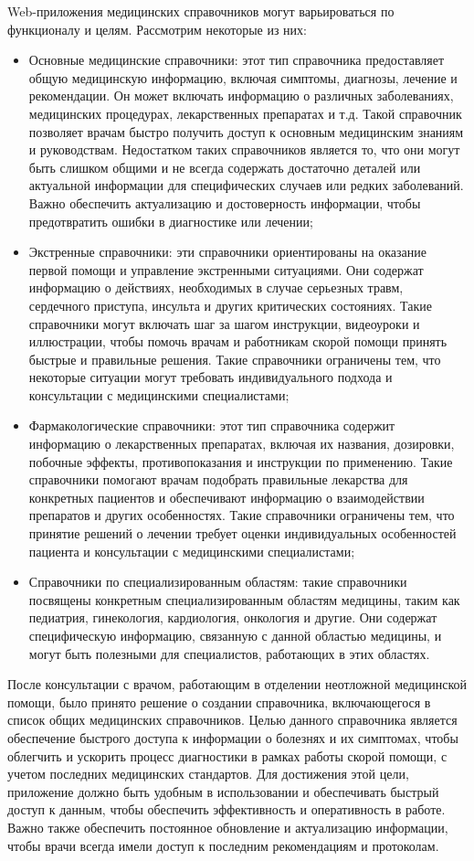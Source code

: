 Web-приложения медицинских справочников могут варьироваться по функционалу и целям. Рассмотрим некоторые из них:
\begin{itemize}
    \item Основные медицинские справочники: этот тип справочника предоставляет общую медицинскую информацию, включая симптомы, диагнозы, лечение и рекомендации. Он может включать информацию о различных заболеваниях, медицинских процедурах, лекарственных препаратах и т.д. Такой справочник позволяет врачам быстро получить доступ к основным медицинским знаниям и руководствам. Недостатком таких справочников является то, что они могут быть слишком общими и не всегда содержать достаточно деталей или актуальной информации для специфических случаев или редких заболеваний. Важно обеспечить актуализацию и достоверность информации, чтобы предотвратить ошибки в диагностике или лечении;
    \item Экстренные справочники: эти справочники ориентированы на оказание первой помощи и управление экстренными ситуациями. Они содержат информацию о действиях, необходимых в случае серьезных травм, сердечного приступа, инсульта и других критических состояниях. Такие справочники могут включать шаг за шагом инструкции, видеоуроки и иллюстрации, чтобы помочь врачам и работникам скорой помощи принять быстрые и правильные решения. Такие справочники ограничены тем, что некоторые ситуации могут требовать индивидуального подхода и консультации с медицинскими специалистами;
    \item Фармакологические справочники: этот тип справочника содержит информацию о лекарственных препаратах, включая их названия, дозировки, побочные эффекты, противопоказания и инструкции по применению. Такие справочники помогают врачам подобрать правильные лекарства для конкретных пациентов и обеспечивают информацию о взаимодействии препаратов и других особенностях. Такие справочники ограничены тем, что принятие решений о лечении требует оценки индивидуальных особенностей пациента и консультации с медицинскими специалистами;
    \item Справочники по специализированным областям: такие справочники посвящены конкретным специализированным областям медицины, таким как педиатрия, гинекология, кардиология, онкология и другие. Они содержат специфическую информацию, связанную с данной областью медицины, и могут быть полезными для специалистов, работающих в этих областях.
\end{itemize}

После консультации с врачом, работающим в отделении неотложной медицинской помощи, было принято решение о создании справочника, включающегося в список общих медицинских справочников. Целью данного справочника является обеспечение быстрого доступа к информации о болезнях и их симптомах, чтобы облегчить и ускорить процесс диагностики в рамках работы скорой помощи, с учетом последних медицинских стандартов. Для достижения этой цели, приложение должно быть удобным в использовании и обеспечивать быстрый доступ к данным, чтобы обеспечить эффективность и оперативность в работе. Важно также обеспечить постоянное обновление и актуализацию информации, чтобы врачи всегда имели доступ к последним рекомендациям и протоколам.

